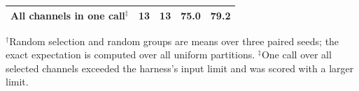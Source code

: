 \begin{table}[H]
\begin{tabular}{@{}lrrrr@{}}
All channels in one call$^{\ddagger}$ & 13 & 13 & 75.0 & 79.2 \\
\bottomrule
\end{tabular}
\par\vspace{3pt}
\begin{minipage}{0.97\linewidth}\footnotesize $^\dagger$Random selection and random groups are means over three paired seeds; the exact expectation is computed over all uniform partitions. $^\ddagger$One call over all selected channels exceeded the harness's input limit and was scored with a larger limit.\end{minipage}
\end{table}
